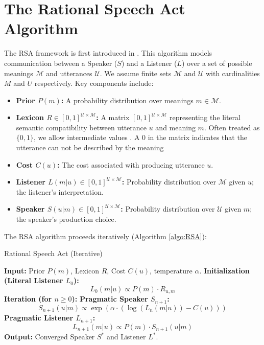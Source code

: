 \documentclass{article}
\begin{document}
\section{The Rational Speech Act Algorithm}
The RSA framework is first introduced in \cite{monroe_learning_2015}. This algorithm models communication between a Speaker ($S$) and a Listener ($L$) over a set of possible meanings $\mathcal{M}$ and utterances $\mathcal{U}$. We assume finite sets $\mathcal{M}$ and $\mathcal{U}$ with cardinalities $M$ and $U$ respectively. Key components include:
\begin{itemize}
    \item \textbf{Prior $P(m)$:} A probability distribution over meanings $m \in \mathcal{M}$.
    \item \textbf{Lexicon $R\in [0,1]^{\mathcal{U}\times \mathcal{M}}$:} A matrix  $[0,1]^{\mathcal{U}\times \mathcal{M}}$ representing the literal semantic compatibility between utterance $u$ and meaning $m$. Often treated as $\{0,1\}$, we allow intermediate values \cite{bergen_pragmatic_2016}. A $0$ in the matrix indicates that the utterance can not be described by the meaning
    \item \textbf{Cost $C(u)$:} The cost associated with producing utterance $u$.
    \item \textbf{Listener $L(m|u) \in [0,1]^{\mathcal{U}\times \mathcal{M}}$:} Probability distribution over $\mathcal{M}$ given $u$; the listener's interpretation.
    \item \textbf{Speaker $S(u|m) \in [0,1]^{\mathcal{U}\times \mathcal{M}}$:} Probability distribution over $\mathcal{U}$ given $m$; the speaker's production choice.
\end{itemize}

The RSA algorithm proceeds iteratively (Algorithm \ref{algo:RSA}):

\begin{algorithm}[H]\caption{Rational Speech Act (Iterative)}\label{algo:RSA}
\begin{algorithmic}[1]
    \State \textbf{Input:} Prior $P(m)$, Lexicon $R$, Cost $C(u)$, temperature $\alpha$.
    \State \textbf{Initialization (Literal Listener $L_0$):}
        \begin{equation}\label{eq:litteral_listener}
            L_0(m|u) \propto P(m) \cdot R_{u,m}
        \end{equation}
    \State \textbf{Iteration (for $n \ge 0$):}
    \State \quad \textbf{Pragmatic Speaker $S_{n+1}$:}
        \begin{equation}\label{eq:pragmatic_speaker}
            S_{n+1}(u|m)\propto \exp(\alpha \cdot (\log(L_n(m|u)) - C(u)))
        \end{equation}
    \State \quad \textbf{Pragmatic Listener $L_{n+1}$:}
        \begin{equation}\label{eq:pragmatic_listener}
            L_{n+1}(m|u) \propto P(m) \cdot S_{n+1}(u|m)
        \end{equation}
    \State \textbf{Output:} Converged Speaker $S^*$ and Listener $L^*$.
    \end{algorithmic}
\end{algorithm}
\end{document}
